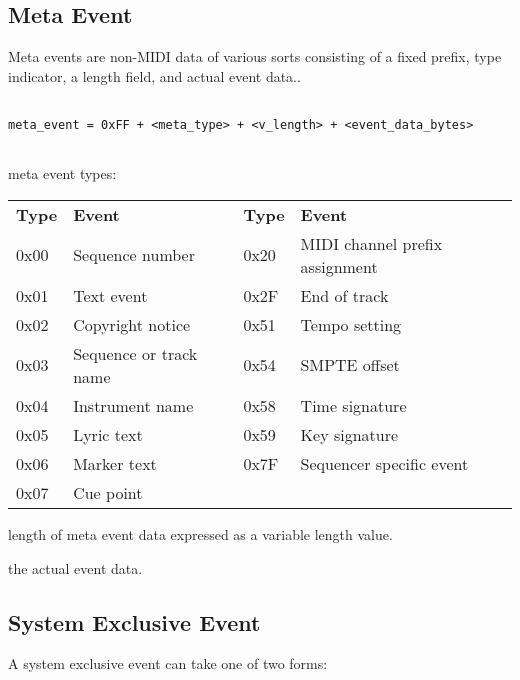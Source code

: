 \protect\hypertarget{meta_event}{}{}

\hypertarget{meta-event}{%
\subsection*{Meta Event}\label{meta-event}}

Meta events are non-MIDI data of various sorts consisting of a fixed
prefix, type indicator, a length field, and actual event data..

\begin{verbatim}
 
meta_event = 0xFF + <meta_type> + <v_length> + <event_data_bytes>
 
\end{verbatim}

\begin{description}
\tightlist
\item[\textbf{\texttt{\ \textless{}meta\_type\textgreater{}}} 1 byte]
meta event types:

\begin{longtable}[]{@{}llll@{}}
\toprule
\endhead
\textbf{Type} & \textbf{Event} & \textbf{Type} &
\textbf{Event}\tabularnewline
0x00 & Sequence number & 0x20 & MIDI channel prefix
assignment\tabularnewline
0x01 & Text event & 0x2F & End of track\tabularnewline
0x02 & Copyright notice & 0x51 & Tempo setting\tabularnewline
0x03 & Sequence or track name & 0x54 & SMPTE offset\tabularnewline
0x04 & Instrument name & 0x58 & Time signature\tabularnewline
0x05 & Lyric text & 0x59 & Key signature\tabularnewline
0x06 & Marker text & 0x7F & Sequencer specific event\tabularnewline
0x07 & Cue point & &\tabularnewline
\bottomrule
\end{longtable}
\item[\textbf{\texttt{\textless{}v\_length\textgreater{}}}]
length of meta event data expressed as a variable length value.
\item[\textbf{\texttt{\textless{}event\_data\_bytes\textgreater{}}}]
the actual event data.
\end{description}

\protect\hypertarget{sysex_event}{}{}

\hypertarget{system-exclusive-event}{%
\subsection*{System Exclusive Event}\label{system-exclusive-event}}

A system exclusive event can take one of two forms:


